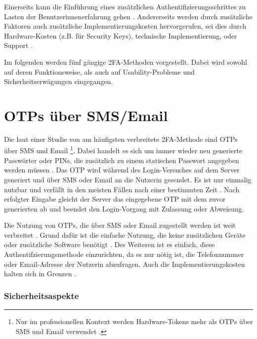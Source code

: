 Einerseits kann die Einführung eines zusätzlichen Authentifizierungsschrittes zu Lasten der Benutzerinnenerfahrung gehen \parencite{decristofaroComparativeUsability2014}. Andererseits werden durch zusätzliche Faktoren auch zusätzliche Implementierungskosten hervorgerufen, sei dies durch Hardware-Kosten (z.B. für Security Keys), technische Implementierung, oder Support \parencite{alsaleemMultiFactorAuthentication2021}.

\pskip
Im folgenden werden fünf gängige \ac{2FA}-Methoden vorgestellt. Dabei wird sowohl auf deren Funktionsweise, als auch auf Usability-Probleme und Sicherheitserwägungen eingegangen.

\section{OTPs über SMS/Email}
\label{sec:otp}

Die laut einer Studie von \citeyear{decristofaroComparativeUsability2014} am häufigsten verbreitete \ac{2FA}-Methode sind \acp{OTP} über SMS und Email \parencite{decristofaroComparativeUsability2014}\footnote{Nur im professionellen Kontext werden Hardware-Tokens mehr als \acp{OTP} über SMS und Email verwendet \parencite{decristofaroComparativeUsability2014}.}. Dabei handelt es sich um immer wieder neu generierte Passwörter oder PINs, die zusätzlich zu einem statischen Passwort angegeben werden müssen \parencite{geramiOneTimePasswords2016}. Das \ac{OTP} wird während des Login-Versuches auf dem Server generiert und über \acs{SMS} oder Email an die Nutzerin gesendet. Es ist nur einmalig nutzbar und verfällt in den meisten Fällen nach einer bestimmten Zeit \parencite{geramiOneTimePasswords2016}. Nach erfolgter Eingabe gleicht der Server das eingegebene \ac{OTP} mit dem zuvor generierten ab und beendet den Login-Vorgang mit Zulassung oder Abweisung.

Die Nutzung von \acp{OTP}, die über SMS oder Email zugestellt werden ist weit verbreitet \parencite{decristofaroComparativeUsability2014}. Grund dafür ist die einfache Nutzung, die keine zusätzlichen Geräte oder zusätzliche Software benötigt \parencite{abhishekComprehensiveStudy2013}. Des Weiteren ist es einfach, diese Authentifzierungsmethode einzurichten, da es nur nötig ist, die Telefonnummer oder Email-Adresse der Nutzerin abzufragen. Auch die Implementierungskosten halten sich in Grenzen \parencite{abhishekComprehensiveStudy2013}.

\subsubsection{Sicherheitsaspekte}

